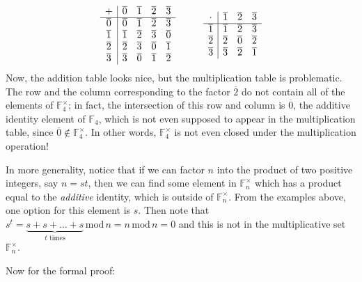\documentclass[12pt]{article}
\begin{document}
\begin{equation*}
    \begin{array}{c|cccc}
    + & \overline{0} & \overline{1} & \overline{2} & \overline{3} \\ \hline
    \overline{0} & \overline{0} & \overline{1} & \overline{2} & \overline{3} \\
    \overline{1} & \overline{1} & \overline{2} & \overline{3} & \overline{0} \\
    \overline{2} & \overline{2} & \overline{3} & \overline{0} & \overline{1} \\
    \overline{3} & \overline{3} & \overline{0} & \overline{1} & \overline{2}
    \end{array}
    \hspace{10mm}
    \begin{array}{c|ccc}
    \cdot & \overline{1} & \overline{2} & \overline{3} \\ \hline
    \overline{1} & \overline{1} & \overline{2} & \overline{3} \\
    \overline{2} & \overline{2} & \overline{0} & \overline{2} \\
    \overline{3} & \overline{3} & \overline{2} & \overline{1}
    \end{array}
\end{equation*}
Now, the addition table looks nice, but the multiplication table is problematic. The row and the column corresponding to the factor $\overline{2}$ do not contain all of the elements of $\mathbb{F}_4^{\times}$; in fact, the intersection of this row and column is $\overline{0}$, the additive identity element of $\mathbb{F}_4$, which is not even supposed to appear in the multiplication table, since $\overline{0} \notin \mathbb{F}_4^{\times}$. In other words, $\mathbb{F}_4^{\times}$ is not even closed under the multiplication operation!

In more generality, notice that if we can factor $n$ into the product of two positive integers, say $n=st$, then we can find some element in $\mathbb{F}_n^{\times}$ which has a product equal to the \textit{additive} identity, which is outside of $\mathbb{F}_n^{\times}$. From the examples above, one option for this element is $s$. Then note that $s^t = \underbrace{s+s+\ldots+s}_{t\text{ times}}\, \text{mod}\, n = n \, \text{mod}\, n = 0 $ and this is not in the multiplicative set $\mathbb{F}_n^{\times}$.

Now for the formal proof:
\end{document}
